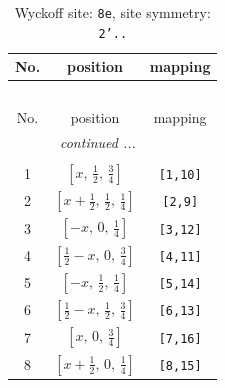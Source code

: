 \documentclass[fleqn,8pt]{jsarticle}
\begin{document}
\renewcommand{\arraystretch}{1.2}
\begin{longtable}{ccc}
\caption{Wyckoff site: {\tt 8e}, site symmetry: {\tt 2'..}}
 \\
 \hline \hline
No. & position & mapping \\ \hline \endfirsthead

\multicolumn{2}{l}{\tablename\ \thetable{}} \\
 \hline \hline
No. & position & mapping \\ \hline \endhead

 \hline \hline
\multicolumn{2}{r}{\footnotesize\it continued ...} \\ \endfoot

 \hline \hline
\multicolumn{2}{r}{} \\ \endlastfoot

1 & $\left[ x,\, \frac{1}{2},\, \frac{3}{4} \right]$ & {\tt [1,10]} \\ \hline
2 & $\left[ x + \frac{1}{2},\, \frac{1}{2},\, \frac{1}{4} \right]$ & {\tt [2,9]} \\ \hline
3 & $\left[ - x,\, 0,\, \frac{1}{4} \right]$ & {\tt [3,12]} \\ \hline
4 & $\left[ \frac{1}{2} - x,\, 0,\, \frac{3}{4} \right]$ & {\tt [4,11]} \\ \hline
5 & $\left[ - x,\, \frac{1}{2},\, \frac{1}{4} \right]$ & {\tt [5,14]} \\ \hline
6 & $\left[ \frac{1}{2} - x,\, \frac{1}{2},\, \frac{3}{4} \right]$ & {\tt [6,13]} \\ \hline
7 & $\left[ x,\, 0,\, \frac{3}{4} \right]$ & {\tt [7,16]} \\ \hline
8 & $\left[ x + \frac{1}{2},\, 0,\, \frac{1}{4} \right]$ & {\tt [8,15]} \\
\end{longtable}
\renewcommand{\arraystretch}{1.2}
\end{document}
